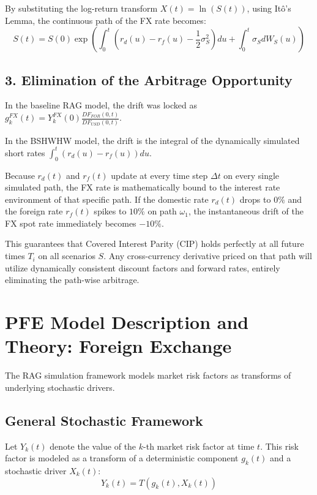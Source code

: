 By substituting the log-return transform $X(t) = \ln(S(t))$, using It\^{o}'s Lemma, the continuous path of the FX rate becomes:
\begin{equation}
	S(t) = S(0) \exp\left( \int_{0}^{t} \left( r_d(u) - r_f(u) - \frac{1}{2}\sigma_S^2 \right)du + \int_{0}^{t} \sigma_S dW_S(u) \right)
\end{equation}

\subsection*{3. Elimination of the Arbitrage Opportunity}
In the baseline RAG model, the drift was locked as $g_k^{FX}(t) = Y_k^{FX}(0) \frac{DF_{FOR}(0,t)}{DF_{USD}(0,t)}$.

In the BSHWHW model, the drift is the integral of the dynamically simulated short rates $\int_{0}^{t} (r_d(u) - r_f(u))du$. 

Because $r_d(t)$ and $r_f(t)$ update at every time step $\Delta t$ on every single simulated path, the FX rate is mathematically bound to the interest rate environment of that specific path. If the domestic rate $r_d(t)$ drops to $0\%$ and the foreign rate $r_f(t)$ spikes to $10\%$ on path $\omega_1$, the instantaneous drift of the FX spot rate immediately becomes $-10\%$. 

This guarantees that Covered Interest Parity (CIP) holds perfectly at all future times $T_i$ on all scenarios $S$. Any cross-currency derivative priced on that path will utilize dynamically consistent discount factors and forward rates, entirely eliminating the path-wise arbitrage.


\newpage

\section{PFE Model Description and Theory: Foreign Exchange}
The RAG simulation framework models market risk factors as transforms of underlying stochastic drivers.

\subsection*{General Stochastic Framework}
Let $Y_k(t)$ denote the value of the $k$-th market risk factor at time $t$. This risk factor is modeled as a transform of a deterministic component $g_k(t)$ and a stochastic driver $X_k(t)$:
\begin{equation}
	Y_k(t) = T(g_k(t), X_k(t))
\end{equation}

